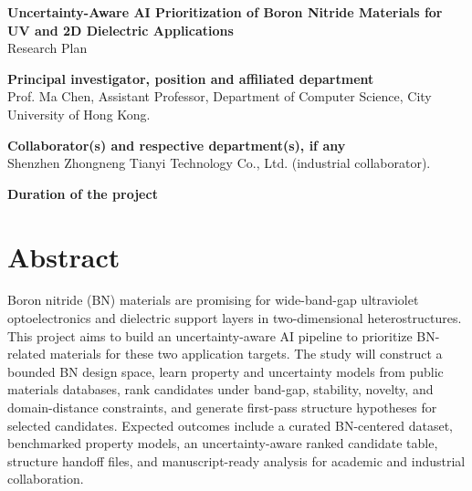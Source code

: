 \documentclass[10pt]{article}
\newcommand{\blank}[1][8em]{\colorbox{yellow!35}{\rule{0pt}{1.1em}\hspace{#1}}}
\begin{document}
\begin{center}
{\Large \textbf{Uncertainty-Aware AI Prioritization of Boron Nitride Materials for UV and 2D Dielectric Applications}}\\
{\normalsize Research Plan}
\end{center}

\textbf{Principal investigator, position and affiliated department}\\
Prof. Ma Chen, Assistant Professor, Department of Computer Science, City University of Hong Kong.

\textbf{Collaborator(s) and respective department(s), if any}\\
Shenzhen Zhongneng Tianyi Technology Co., Ltd. (industrial collaborator).

\textbf{Duration of the project}\\
\blank[18em]

\section*{Abstract}
Boron nitride (BN) materials are promising for wide-band-gap ultraviolet optoelectronics and dielectric support layers in two-dimensional heterostructures. This project aims to build an uncertainty-aware AI pipeline to prioritize BN-related materials for these two application targets. The study will construct a bounded BN design space, learn property and uncertainty models from public materials databases, rank candidates under band-gap, stability, novelty, and domain-distance constraints, and generate first-pass structure hypotheses for selected candidates. Expected outcomes include a curated BN-centered dataset, benchmarked property models, an uncertainty-aware ranked candidate table, structure handoff files, and manuscript-ready analysis for academic and industrial collaboration.
\end{document}
